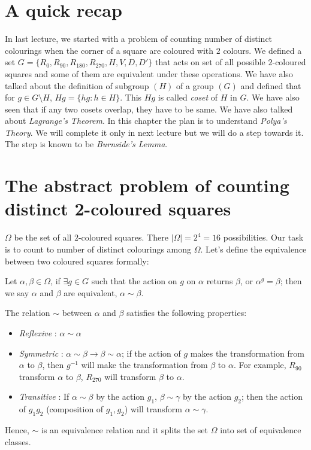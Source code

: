 \section{A quick recap}
 In last lecture, we started with a problem of counting number of distinct colourings when the corner of a square are coloured with $2$ colours. We defined a set $G=\{R_0,R_{90},R_{180},R_{270},H,V,D,D'\} $ that acts on set of all possible $2$-coloured squares and some of them are equivalent under these operations. We have also talked about the definition of subgroup $(H)$ of a group $(G)$ and defined that for $g\in G\setminus H$, $Hg=\{hg: h\in H \}$. This $Hg$ is called \emph{coset} of $H$ in $G$. 
We have also seen that if any two cosets overlap, they have to be same. We have also talked about \emph{Lagrange's Theorem}. In this chapter the plan is to understand \emph{Polya's Theory}. We will complete it only in next lecture but we will do a step towards it. The step is known to be \emph{Burnside's Lemma}. 
\section{The abstract problem of counting distinct 2-coloured squares}
 $\Omega$ be the set of all $2$-coloured squares. There $|\Omega|=2^4=16$ possibilities. Our task is to count to number of distinct colourings among $\Omega$. Let's define the equivalence between two coloured squares formally:
 \begin{definition}
 Let $\alpha,\beta\in \Omega$, if $\exists g\in G$ such that the action on $g$ on $\alpha$ returns $\beta$, or $\alpha^g=\beta$; then we say $\alpha$ and $\beta$ are equivalent, $\alpha\sim \beta$.
\end{definition}
The relation $\sim$ between $\alpha$ and $\beta$ satisfies the following properties:
\begin{itemize}
\item \emph{Reflexive} : $\alpha\sim \alpha$
\item \emph{Symmetric} : $\alpha\sim \beta\rightarrow \beta\sim \alpha$; if the action of $g$ makes the transformation from $\alpha$ to $\beta$, then $g^{-1}$ will make the transformation from $\beta$ to $\alpha$. For example, $R_{90}$ transform $\alpha$ to $\beta$, $R_{270}$ will transform $\beta$ to $\alpha$.
\item \emph{Transitive} : If $\alpha\sim \beta$ by the action $g_1$, $\beta\sim \gamma$ by the action $g_2$; then the action of $g_1g_2$ (composition of $g_1,g_2$) will transform $\alpha\sim \gamma$.
\end{itemize}
Hence, $\sim$ is an equivalence relation and it splits the set $\Omega$ into set of equivalence classes.
